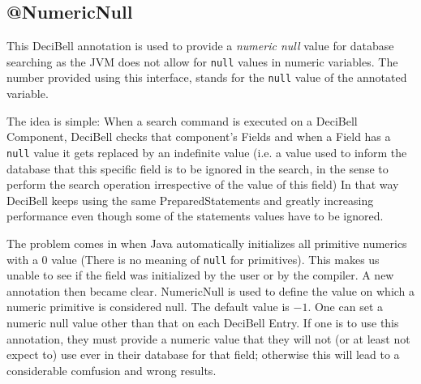 \documentclass[a4paper,10pt]{article}
\begin{document}
\subsection*{@NumericNull}\label{numericnull}
This DeciBell annotation is used to provide a \emph{numeric null} value for database
searching as the JVM does not allow for \texttt{null} values in numeric variables. The number
provided using this interface, stands for the \texttt{null} value of the annotated variable.

The idea is simple: When a search command is executed on a DeciBell
Component, DeciBell checks that component's Fields and when a Field has a \texttt{null}
value it gets replaced by an indefinite value (i.e. a value used to inform the database
that this specific field is to be ignored in the search, in the sense to perform
the search operation irrespective of the value of this field)
In that way DeciBell keeps using the same PreparedStatements and
greatly increasing performance even though some of the statements values have
to be ignored.

The problem comes in when Java automatically initializes all primitive numerics
with a $0$ value (There is no meaning of \texttt{null} for primitives).
This makes us unable to see if the field was initialized by
the user or by the compiler. A new annotation then became clear.
NumericNull is used to define the value on which a numeric primitive is
considered null. The default value is $-1$. One can set a numeric null value
other than that on each DeciBell Entry. If one is to use this annotation, they must provide
a numeric value that they will not (or at least not expect to) use ever in their
database for that field; otherwise this will lead to a considerable comfusion and
wrong results.
\end{document}
